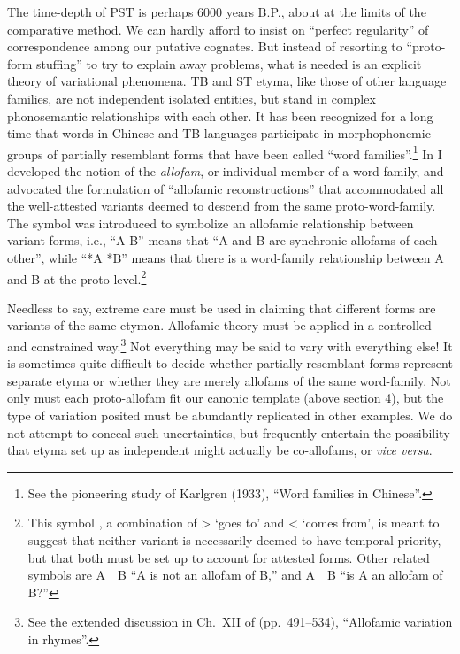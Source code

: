 The time-depth of PST is perhaps 6000 years B.P., about at the limits of the
comparative method. We can hardly afford to insist on “perfect regularity” of
correspondence among our putative cognates. But instead of resorting to
“proto-form stuffing” to try to explain away problems, what is needed is an
explicit theory of variational phenomena. TB and ST etyma, like those of other
language families, are not independent isolated entities, but stand in complex
phonosemantic relationships with each other. It has been recognized for a long
time that words in Chinese and TB languages participate in morphophonemic groups
of partially resemblant forms that have been called “word families”.\footnote{See
the pioneering study of Karlgren (1933), “Word families in Chinese”.}  In
\textit{} I developed the notion of the \textit{allofam},
or individual member of a word-family, and advocated the formulation of “allofamic reconstructions”
that accommodated all the well-attested variants deemed to descend from the same
proto-word-family. The symbol  was introduced to symbolize an allofamic
relationship between variant forms, i.e., “A  B” means that “A and B are
synchronic allofams of each other”, while “*A  *B” means that there is a
word-family relationship between A and B at the proto-level.\footnote{This
symbol , a combination of  >  ‘goes to’ and < ‘comes from’, is meant to suggest
that neither variant is necessarily deemed to have temporal priority, but that
both must be set up to account for attested forms. Other related symbols are A~~B “A is not an allofam of B,” and A~~B “is A an allofam of B?”}


Needless to say, extreme care must be used in claiming that different forms
are variants of the same etymon. Allofamic theory must be applied in a
controlled and constrained way.\footnote{See the extended discussion in Ch.~XII
of \textit{} (pp.~491–534), “Allofamic variation in  rhymes”.} Not everything may be
said to vary with everything else! It is sometimes quite difficult to decide
whether partially resemblant forms represent separate etyma or whether they are
merely allofams of the same word-family. Not only must each proto-allofam fit
our canonic template (above section 4), but the type of variation posited must be
abundantly replicated in other examples. We do not attempt to
conceal such uncertainties, but frequently entertain the possibility that etyma
set up as independent might actually be co-allofams, or \textit{vice versa}.

